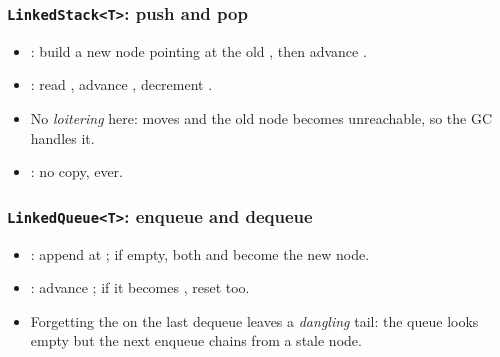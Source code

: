 \documentclass[aspectratio=169,10pt,compress]{beamer}
\begin{document}
\begin{frame}[t,fragile] \frametitle{\texttt{LinkedStack<T>}: push and pop}
  \begin{itemize}\small
    \item {}: build a new node pointing at the old , then advance .
    \item {}: read , advance , decrement .
    \item No \emph{loitering} here:  moves and the old node becomes
          unreachable, so the GC handles it.
    \item {}: no copy, ever.
  \end{itemize}
\end{frame}




\begin{frame}[t,fragile] \frametitle{\texttt{LinkedQueue<T>}: enqueue and dequeue}
  \begin{itemize}\small
    \item {}: append at ; if empty, both  and
           become the new node.
    \item {}: advance ; if it becomes ,
          reset  too.
    \item Forgetting the  on the last dequeue leaves a
          \emph{dangling} tail: the queue looks empty but the next enqueue
          chains from a stale node.
  \end{itemize}
\end{frame}

\end{document}

